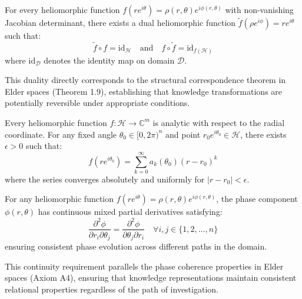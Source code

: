 \begin{axiom}
For every heliomorphic function $f(re^{i\theta}) = \rho(r,\theta)e^{i\phi(r,\theta)}$ with non-vanishing Jacobian determinant, there exists a dual heliomorphic function $\tilde{f}(\rho e^{i\phi}) = re^{i\theta}$ such that:
\begin{equation}
\tilde{f} \circ f = \text{id}_{\mathcal{H}} \quad \text{and} \quad f \circ \tilde{f} = \text{id}_{f(\mathcal{H})}
\end{equation}
where $\text{id}_{\mathcal{D}}$ denotes the identity map on domain $\mathcal{D}$.
\end{axiom}

\begin{remark}
This duality directly corresponds to the structural correspondence theorem in Elder spaces (Theorem 1.9), establishing that knowledge transformations are potentially reversible under appropriate conditions.
\end{remark}

\begin{axiom}
Every heliomorphic function $f: \mathcal{H} \rightarrow \mathbb{C}^m$ is analytic with respect to the radial coordinate. For any fixed angle $\theta_0 \in [0, 2\pi)^n$ and point $r_0e^{i\theta_0} \in \mathcal{H}$, there exists $\epsilon > 0$ such that:
\begin{equation}
f(re^{i\theta_0}) = \sum_{k=0}^{\infty} a_k(\theta_0)(r-r_0)^k
\end{equation}
where the series converges absolutely and uniformly for $|r-r_0| < \epsilon$.
\end{axiom}

\begin{axiom}
For any heliomorphic function $f(re^{i\theta}) = \rho(r,\theta)e^{i\phi(r,\theta)}$, the phase component $\phi(r,\theta)$ has continuous mixed partial derivatives satisfying:
\begin{equation}
\frac{\partial^2 \phi}{\partial r_i \partial \theta_j} = \frac{\partial^2 \phi}{\partial \theta_j \partial r_i} \quad \forall i,j \in \{1,2,\ldots,n\}
\end{equation}
ensuring consistent phase evolution across different paths in the domain.
\end{axiom}

\begin{remark}
This continuity requirement parallels the phase coherence properties in Elder spaces (Axiom A4), ensuring that knowledge representations maintain consistent relational properties regardless of the path of investigation.
\end{remark}

